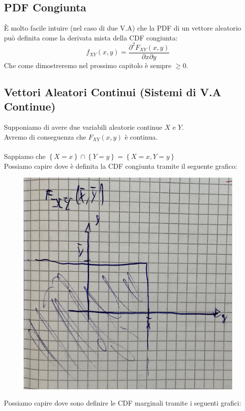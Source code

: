\documentclass{article}
\begin{document}
\subsection{PDF Congiunta}
È molto facile intuire (nel caso di due V.A) che la PDF di un vettore aleatorio può definita come la derivata mista della CDF congiunta:
\[f_{XY}(x,y) = \frac{\partial^2 F_{XY}(x,y)}{\partial x \partial y}\]
Che come dimostreremo nel prossimo capitolo è sempre $\geq 0$.

\subsection{Vettori Aleatori Continui (Sistemi di V.A Continue)}
Supponiamo di avere due variabili aleatorie continue $X$ e $Y$. \\
Avremo di conseguenza che $F_{XY}(x,y)$ è continua. \\ \\
Sappiamo che $\left\{ X = x \right\} \cap \left\{ Y = y\right\} = \left\{X = x , Y = y\right\}$ \\
Possiamo capire dove è definita la CDF congiunta tramite il seguente grafico:
\begin{figure}[H]
\centering
\includegraphics[scale=0.10]{images/76.CDF_Cong_Cont.jpeg}
\end{figure} 
Possiamo capire dove sono definire le CDF marginali tramite i seguenti grafici:
\end{document}
